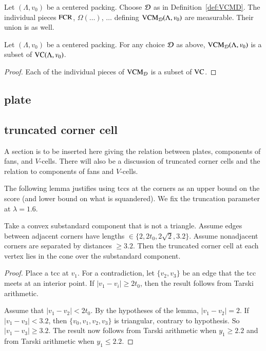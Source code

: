\begin{lemma}
Let $(\Lambda,v_0)$ be a centered packing.  Choose ${\mathcal D}$ as in Definition~\ref{def:VCMD}.  
The individual pieces ${\operatorname{FCR}}$, $\Omega(\ldots)$, $\ldots$ 
defining ${\operatorname{VCM}}_{{\mathcal D}}(\Lambda,v_0)$ are measurable.  Their union is as well.
\end{lemma}

\begin{lemma}
Let $(\Lambda,v_0)$ be a centered packing.
For any choice ${\mathcal D}$ as above,  ${\operatorname{VCM}}_{{\mathcal D}}(\Lambda,v_0)$ is a subset of ${\operatorname{VC}}(\Lambda,v_0)$.
\end{lemma}

\begin{proof}  Each of the individual pieces of ${\operatorname{VCM}}_{{\mathcal D}}$ is a subset of ${\operatorname{VC}}$.
\end{proof}





\subsection{plate}


\subsection{truncated corner cell} %

A section is to be inserted here giving the relation between
plates, components of fans, and $V$-cells.  There will also
be a discussion of truncated corner cells and the relation to
components of fans and $V$-cells.%


The following lemma justifies using tccs at the corners as an upper
bound on the score (and lower bound on what is squandered). We fix the
truncation parameter at $\lambda=1.6$.

\begin{lemma}
Take a convex substandard component that is not a triangle.  Assume edges between
adjacent corners have lengths $\in\{2,2t_0,2\sqrt{2},3.2\}$. Assume
nonadjacent corners are separated by distances $\ge3.2$.  Then the
truncated corner cell at each vertex lies in the cone over the
substandard component.
\end{lemma}

\begin{proof}
Place a tcc at $v_1$. For a contradiction, let $\{v_2,v_3\}$ be an
edge that the tcc meets at an interior point.  
If $|v_1-v_i|\ge 2t_0$, then the result follows from
Tarski arithmetic.  

Assume that
 $|v_1-v_2|<2t_0$.  By the hypotheses of the lemma,
$|v_1-v_2|=2$.  If $|v_1-v_3|<3.2$, then $\{v_0,v_1,v_2,v_3\}$ is
triangular, contrary to hypothesis.  So $|v_1-v_3|\ge3.2$.
The result now follows from Tarski arithmetic when
$y_1\ge 2.2$ and from Tarski arithmetic when
$y_1\le 2.2$.
\end{proof}








